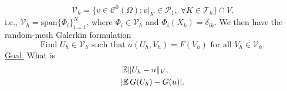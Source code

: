 \documentclass{siamart1116}
\numberwithin{theorem}{section}
\DeclarePairedDelimiter{\abs}{\lvert}{\rvert}
\DeclarePairedDelimiter{\norm}{\|}{\|}
\newcommand{\E}{\operatorname{\mathbb{E}}}
\begin{document}
\begin{equation}
	\mathcal{V}_h = \{v \in \mathcal{C}^0(\Omega) \colon v|_{K} \in \mathcal{P}_1, \; \forall K \in \mathcal{T}_h\} \cap V.
\end{equation}
i.e., $\mathcal{V}_h = \mathrm{span}\{\Phi_i\}_{i=1}^N$, where $\Phi_i \in \mathcal{V}_h$ and $\Phi_i(X_k) = \delta_{ik}$. We then have the random-mesh Galerkin formulation
\begin{equation}
	\text{Find } U_h \in \mathcal{V}_h \text{ such that } a(U_h,V_h) = F(V_h) \text{ for all } V_h \in \mathcal{V}_h.
\end{equation}
\underline{Goal.} What is
\begin{align}
	&\E \norm{U_h - u}_V, \\
	&\abs{\E G(U_h) - G(u)}. 
\end{align}
\end{document}
